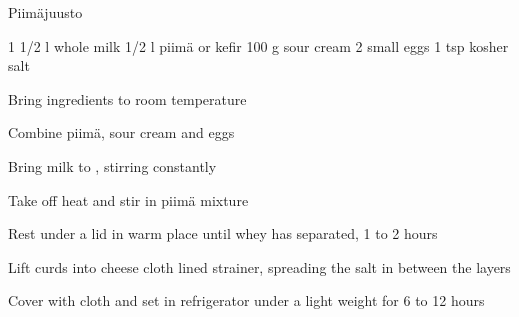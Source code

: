 \begin{recipe}{Piimäjuusto}{}
\begin{ingredients}
1 1/2 l whole milk
1/2 l piimä or kefir
100 g sour cream
2 small eggs
1 tsp kosher salt
\end{ingredients}
\nextcolumn
\begin{steps}
    \item Bring ingredients to room temperature
    \item Combine piimä, sour cream and eggs
    \item Bring milk to , stirring constantly
    \item Take off heat and stir in piimä mixture
    \item Rest under a lid in warm place until whey has separated, 1 to 2 hours
    \item Lift curds into cheese cloth lined strainer, spreading the salt in between the layers
    \item Cover with cloth and set in refrigerator under a light weight for 6 to 12 hours
\end{steps}
\end{recipe}